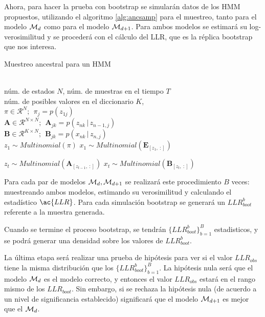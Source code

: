 Ahora, para hacer la prueba con bootstrap se simularán datos de los \ac{HMM} propuestos, utilizando el algoritmo \ref{alg:ancsamp} para el muestreo, tanto para el modelo $\mathcal{M}_d$ como para el modelo $\mathcal{M}_{d+1}$. Para ambos modelos se estimará su log-verosimilitud y se procederá con el cálculo del \ac{LLR}, que es la réplica bootstrap que nos interesa. 

\begin{algorithm}[tp]
   \caption{Muestreo ancestral para un HMM}
   \label{alg:ancsamp}
\begin{algorithmic}
    \\
   núm. de estados $N$, núm. de muestras en el tiempo $T$ \\
   núm. de posibles valores en el diccionario $K$, \\
   $ \pi \in \mathcal{R}^{N}; ~~ \pi_j = p(z_{1j})$ \\
   $ \mathbf{A} \in \mathcal{R}^{N \times N}; ~~
   \mathbf{A}_{jk} = p(z_{nk} \,|\, z_{n-1, j})$ \\

   $ \mathbf{B} \in \mathcal{R}^{K \times N}; ~~
   \mathbf{B}_{jk} = p(x_{nk} \,|\, z_{n, j})$\\  
   \STATE
   \STATE $z_1 \sim Multinomial(\pi)$   
   \STATE $x_1 \sim Multinomial(\mathbf{E}_{[z_1,~:]})$

    \STATE $z_t \sim Multinomial(\mathbf{A}_{[z_{t-1},~:]})$ 
    \STATE $x_t \sim Multinomial(\mathbf{B}_{[z_t,~:]})$
   \ENDFOR   
\end{algorithmic}
\end{algorithm}

Para cada par de modelos $\mathcal{M}_d, \mathcal{M}_{d+1}$ se realizará este procedimiento $B$ veces: muestreando ambos modelos, estimando su verosimilitud y calculando el estadístico $\ac{LLR}$. Para cada simulación bootstrap se generará un $LLR_{boot}^b$ referente a la muestra generada. 

Cuando se termine el proceso bootstrap, se tendrán $\lbrace LLR_{boot}^b \rbrace_{b=1}^B$ estadisticos, y se podrá generar una densidad sobre los valores de $LLR_{boot}^b$. 

La última etapa será realizar una prueba de hipótesis para ver si el valor $LLR_{obs}$ tiene la misma distribución que los $\lbrace LLR_{boot}^b \rbrace_{b=1}^B$. La hipótesis nula será que el modelo $\mathcal{M}_d$ es el modelo correcto, y entonces el valor $LLR_{obs}$ estará en el rango mismo de los $LLR_{boot}$. Sin embargo, si se rechaza la hipótesis nula (de acuerdo a un nivel de significancia establecido) significará que el modelo $\mathcal{M}_{d+1}$ es mejor que el $\mathcal{M}_{d}$.